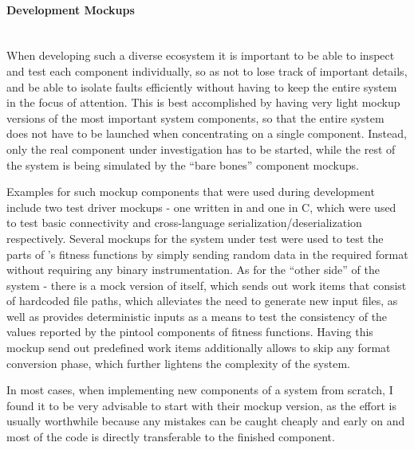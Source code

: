 \paragraph{Development Mockups} ~\\
When developing such a diverse ecosystem it is important to be able to inspect and test each component
individually, so as not to lose track of important details, and be able to isolate faults efficiently without
having to keep the entire system in the focus of attention. This is best accomplished by having very light
mockup versions of the most important system components, so that the entire system does not have to be launched
when concentrating on a single component. Instead, only the real component under investigation has to be
started, while the rest of the system is being simulated by the ``bare bones'' component  mockups. 

Examples for such mockup components that were used during development include two test driver mockups - one
written in \java and one in {\small C}, which were used to test basic \zmq connectivity and
cross-language \msgpack serialization/deserialization respectively. Several mockups for the system under test
were used to test the \java parts of \xmlmate's fitness functions by simply sending random data in the
required \msgpack format without requiring any binary instrumentation. As for the ``other side'' of the system
- there is a mock version of \xmlmate itself, which sends out work items that consist of hardcoded file paths,
which alleviates the need to generate new input files, as well as provides deterministic inputs as a means to
test the consistency of the values reported by the pintool components of fitness functions. Having this mockup
send out predefined work items additionally allows to skip any format conversion phase, which further lightens
the complexity of the system. 

In most cases, when implementing new components of a system from scratch, I found it to be very advisable to
start with their mockup version, as the effort is usually worthwhile because any mistakes can be caught
cheaply and early on and most of the code is directly transferable to the finished component.
